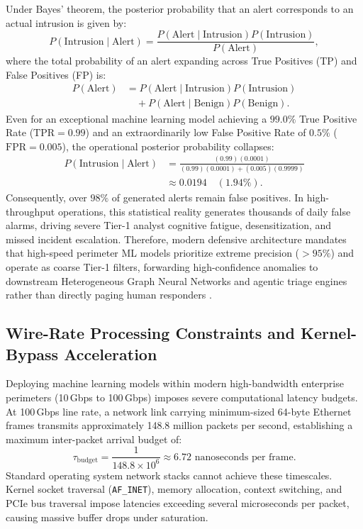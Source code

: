 \documentclass[conference,10pt,twocolumn,a4paper]{IEEEtran}
\begin{document}
Under Bayes' theorem, the posterior probability that an alert corresponds to an actual intrusion is given by:
\begin{equation}
P(\mathrm{Intrusion} \mid \mathrm{Alert}) = \frac{P(\mathrm{Alert} \mid \mathrm{Intrusion}) P(\mathrm{Intrusion})}{P(\mathrm{Alert})},
\end{equation}
where the total probability of an alert expanding across True Positives (TP) and False Positives (FP) is:
\begin{equation}
\begin{split}
P(\mathrm{Alert}) &= P(\mathrm{Alert} \mid \mathrm{Intrusion}) P(\mathrm{Intrusion}) \\
&\quad + P(\mathrm{Alert} \mid \mathrm{Benign}) P(\mathrm{Benign}).
\end{split}
\end{equation}
Even for an exceptional machine learning model achieving a $99.0\%$ True Positive Rate ($\mathrm{TPR} = 0.99$) and an extraordinarily low False Positive Rate of $0.5\%$ ($\mathrm{FPR} = 0.005$), the operational posterior probability collapses:
\begin{equation}
\begin{split}
P(\mathrm{Intrusion} \mid \mathrm{Alert}) &= \frac{(0.99)(0.0001)}{(0.99)(0.0001) + (0.005)(0.9999)} \\
&\approx 0.0194 \quad (1.94\%).
\end{split}
\end{equation}
Consequently, over $98\%$ of generated alerts remain false positives. In high-throughput operations, this statistical reality generates thousands of daily false alarms, driving severe Tier-1 analyst cognitive fatigue, desensitization, and missed incident escalation. Therefore, modern defensive architecture mandates that high-speed perimeter ML models prioritize extreme precision ($>95\%$) and operate as coarse Tier-1 filters, forwarding high-confidence anomalies to downstream Heterogeneous Graph Neural Networks and agentic triage engines rather than directly paging human responders \cite{cisa_agentic_ai_2026, jiang2024provenance}.

\subsection{Wire-Rate Processing Constraints and Kernel-Bypass Acceleration}
Deploying machine learning models within modern high-bandwidth enterprise perimeters (10\,Gbps to 100\,Gbps) imposes severe computational latency budgets. At 100\,Gbps line rate, a network link carrying minimum-sized 64-byte Ethernet frames transmits approximately 148.8 million packets per second, establishing a maximum inter-packet arrival budget of:
\begin{equation}
\tau_{\mathrm{budget}} = \frac{1}{148.8 \times 10^6} \approx 6.72\text{ nanoseconds per frame.}
\end{equation}
Standard operating system network stacks cannot achieve these timescales. Kernel socket traversal (\texttt{AF\_INET}), memory allocation, context switching, and PCIe bus traversal impose latencies exceeding several microseconds per packet, causing massive buffer drops under saturation.
\end{document}
